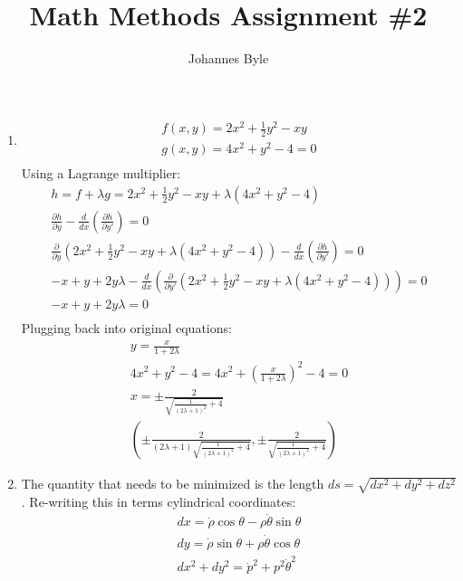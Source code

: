 \documentclass[12pt]{article}
\title{Math Methods Assignment \#2}
\author{Johannes Byle}
\begin{document}
    \maketitle
    \begin{enumerate}
        \item
        \begin{gather*}
            f(x,y)=2x^2+\frac{1}{2}y^2-xy\\
            g(x,y)=4x^2+y^2-4=0\\
        \end{gather*}
        Using a Lagrange multiplier:
        \begin{gather*}
            h=f+\lambda g=2x^2+\frac{1}{2}y^2-xy+\lambda\left(4x^2+y^2-4\right)\\
            \frac{\partial h}{\partial y}-\frac{d}{dx}\left(\frac{\partial h}{\partial y'}\right)=0\\
            \frac{\partial }{\partial y}\left(2x^2+\frac{1}{2}y^2-xy+\lambda\left(4x^2+y^2-4\right)\right)-\frac{d}{dx}\left(\frac{\partial h}{\partial y'}\right)=0\\
            -x+y+2y\lambda-\frac{d}{dx}\left(\frac{\partial}{\partial y'}\left(2x^2+\frac{1}{2}y^2-xy+\lambda\left(4x^2+y^2-4\right)\right)\right)=0\\
            -x+y+2y\lambda=0\\
        \end{gather*}
        Plugging back into original equations:
        \begin{gather*}
            y=\frac{x}{1+2\lambda}\\
            4x^2+y^2-4=4x^2+\left(\frac{x}{1+2\lambda}\right)^2-4=0\\
            x=\pm\frac{2}{\sqrt{\frac{1}{(2 \lambda +1)^2}+4}}\\
            \left(\pm\frac{2}{(2 \lambda +1) \sqrt{\frac{1}{(2 \lambda +1)^2}+4}},\pm\frac{2}{\sqrt{\frac{1}{(2 \lambda +1)^2}+4}}\right)
        \end{gather*}
        \item
        The quantity that needs to be minimized is the length $ds=\sqrt{dx^2+dy^2+dz^2}$.
        Re-writing this in terms cylindrical coordinates:
        \begin{gather*}
            dx=\dot{\rho}\cos\theta-\rho\dot{\theta}\sin\theta\\
            dy=\dot{\rho}\sin\theta+\rho\dot{\theta}\cos\theta\\
            dx^2+dy^2=\dot{p}^2+p^2 \dot{\theta}^2\\

\end{gather*}
\end{enumerate}
\end{document}
